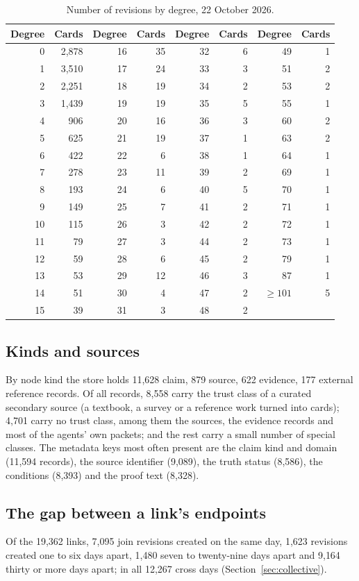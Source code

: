 \begin{table}[ht]\centering\small
\begin{tabular}{rr@{\qquad}rr@{\qquad}rr@{\qquad}rr}
\toprule
Degree & Cards & Degree & Cards & Degree & Cards & Degree & Cards\\
\midrule
0 & 2{,}878 & 16 & 35 & 32 & 6 & 49 & 1\\
1 & 3{,}510 & 17 & 24 & 33 & 3 & 51 & 2\\
2 & 2{,}251 & 18 & 19 & 34 & 2 & 53 & 2\\
3 & 1{,}439 & 19 & 19 & 35 & 5 & 55 & 1\\
4 & 906 & 20 & 16 & 36 & 3 & 60 & 2\\
5 & 625 & 21 & 19 & 37 & 1 & 63 & 2\\
6 & 422 & 22 & 6 & 38 & 1 & 64 & 1\\
7 & 278 & 23 & 11 & 39 & 2 & 69 & 1\\
8 & 193 & 24 & 6 & 40 & 5 & 70 & 1\\
9 & 149 & 25 & 7 & 41 & 2 & 71 & 1\\
10 & 115 & 26 & 3 & 42 & 2 & 72 & 1\\
11 & 79 & 27 & 3 & 44 & 2 & 73 & 1\\
12 & 59 & 28 & 6 & 45 & 2 & 79 & 1\\
13 & 53 & 29 & 12 & 46 & 3 & 87 & 1\\
14 & 51 & 30 & 4 & 47 & 2 & ${\ge}101$ & 5\\
15 & 39 & 31 & 3 & 48 & 2 &  & \\
\bottomrule\end{tabular}
\caption{Number of revisions by degree, 22 October 2026.}\label{tab:degree}
\end{table}

\subsection*{Kinds and sources}
By node kind the store holds 11{,}628 claim, 879 source, 622 evidence, 177 external reference records. Of all records, 8{,}558 carry the trust class of a curated secondary source (a textbook, a survey or a reference work turned into cards); 4{,}701 carry no trust class, among them the sources, the evidence records and most of the agents' own packets; and the rest carry a small number of special classes. The metadata keys most often present are the claim kind and domain (11{,}594 records), the source identifier (9{,}089), the truth status (8{,}586), the conditions (8{,}393) and the proof text (8{,}328).

\subsection*{The gap between a link's endpoints}
Of the 19{,}362 links, 7{,}095 join revisions created on the same day, 1{,}623 revisions created one to six days apart, 1{,}480 seven to twenty-nine days apart and 9{,}164 thirty or more days apart; in all 12{,}267 cross days (Section~\ref{sec:collective}).
